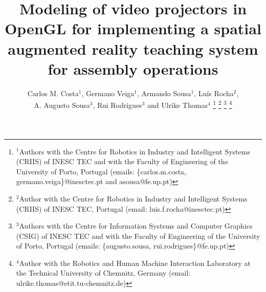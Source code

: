 








\title{\LARGE \bf
Modeling of video projectors in OpenGL for implementing a spatial augmented reality teaching system for assembly operations
}

\author{Carlos M. Costa$^{1}$, Germano Veiga$^{1}$, Armando Sousa$^{1}$, Luís Rocha$^{2}$,\\A. Augusto Sousa$^{3}$, Rui Rodrigues$^{3}$ and Ulrike Thomas$^{4}$%
\thanks{$^{1}$Authors with the Centre for Robotics in Industry and Intelligent Systems (CRIIS) of INESC TEC and with the Faculty of Engineering of the University of Porto, Portugal (emails: \{carlos.m.costa, germano.veiga\}@inesctec.pt and asousa@fe.up.pt)}%
\thanks{$^{2}$Author with the Centre for Robotics in Industry and Intelligent Systems (CRIIS) of INESC TEC, Portugal (email: luis.f.rocha@inesctec.pt)}%
\thanks{$^{3}$Authors with the Centre for Information Systems and Computer Graphics (CSIG) of INESC TEC and with the Faculty of Engineering of the University of Porto, Portugal (emails: \{augusto.sousa, rui.rodrigues\}@fe.up.pt)}%
\thanks{$^{4}$Author with the Robotics and Human Machine Interaction Laboratory at the Technical University of Chemnitz, Germany (email: ulrike.thomas@etit.tu-chemnitz.de)}%
}


\maketitle



















